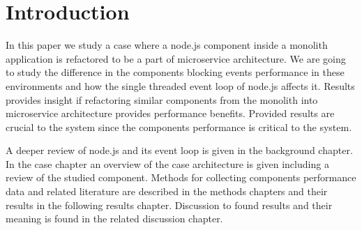 \chapter{Introduction\label{intro}}
In this paper we study a case where a node.js component inside a monolith application is refactored to be a part of microservice architecture.
We are going to study the difference in the components blocking events performance in these environments and how the single threaded event loop of node.js affects it.
Results provides insight if refactoring similar components from the monolith into microservice architecture provides performance benefits.
Provided results are crucial to the system since the components performance is critical to the system.

A deeper review of node.js and its event loop is given in the background chapter.
In the case chapter an overview of the case architecture is given including a review of the studied component.
Methods for collecting components performance data and related literature are described in the methods chapters and their results in the following results chapter.
Discussion to found results and their meaning is found in the related discussion chapter.

